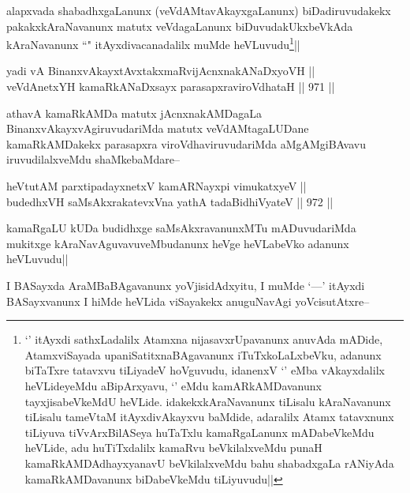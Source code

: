 \begin{artha}
alapxvada shabadhxgaLanunx (veVdAMtavAkayxgaLanunx) biDadiruvudakekx pakakxkAraNavanunx matutx veVdagaLanunx biDuvudakUkxbeVkAda kAraNavanunx ``\stext" itAyxdivacanadalilx muMde heVLuvudu\footnote{`\stext' itAyxdi sathxLadalilx Atamxna nijasavxrUpavanunx anuvAda mADide, AtamxviSayada upaniSatitxnaBAgavanunx iTuTxkoLaLxbeVku, adanunx biTaTxre tatavxvu tiLiyadeV hoVguvudu, idanenxV `\stext' eMba vAkayxdalilx heVLideyeMdu aBipArxyavu, `\stext' eMdu kamARkAMDavanunx tayxjisabeVkeMdU heVLide. idakekxkAraNavanunx tiLisalu kAraNavanunx tiLisalu tameVtaM itAyxdivAkayxvu baMdide, adaralilx Atamx tatavxnunx tiLiyuva tiVvArxBilASeya huTaTxlu kamaRgaLanunx mADabeVkeMdu heVLide, adu huTiTxdalilx kamaRvu beVkilalxveMdu punaH kamaRkAMDAdhayxyanavU beVkilalxveMdu bahu shabadxgaLa rANiyAda kamaRkAMDavanunx biDabeVkeMdu tiLiyuvudu||}||
\end{artha}


\begin{shl}
yadi vA BinanxvAkayxtAvxtakxmaRvijAcnxnakANaDxyoVH || \\
veVdAnetxYH kamaRkANaDxsayx parasapxraviroVdhataH ||  971 ||  
\end{shl}

\begin{artha}
athavA kamaRkAMDa matutx jAcnxnakAMDagaLa BinanxvAkayxvAgiruvudariMda matutx veVdAMtagaLUDane kamaRkAMDakekx parasapxra viroVdhaviruvudariMda aMgAMgiBAvavu iruvudilalxveMdu shaMkebaMdare--
\end{artha}


\begin{shl}
heVtutAM parxtipadayxnetxV kamARNayxpi vimukatxyeV || \\
budedhxVH saMsAkxrakatevxVna yathA tadaBidhiVyateV ||  972 ||  
\end{shl}

\begin{artha}
kamaRgaLU kUDa budidhxge saMsAkxravanunxMTu mADuvudariMda mukitxge kAraNavAguvavuveMbudanunx heVge heVLabeVko adanunx heVLuvudu||
\end{artha}

\begin{artha}
I BASayxda AraMBaBAgavanunx yoVjisidAdxyitu, I muMde `\stext---' itAyxdi BASayxvanunx I hiMde heVLida viSayakekx anuguNavAgi yoVcisutAtxre--
\end{artha}

